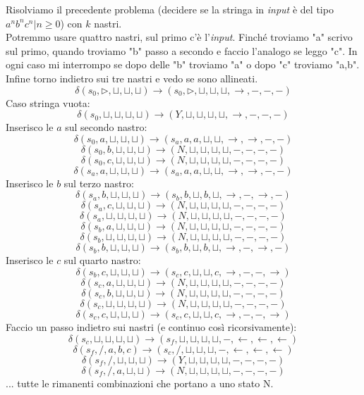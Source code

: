 \begin{esempio}
  Risolviamo il precedente problema (decidere se la stringa in \textit{input} è del tipo
  $a^nb^nc^n | n\geq0$) con $k$ nastri.\\
   Potremmo usare quattro nastri, sul primo c'è l'\textit{input}. Finché  troviamo "a" scrivo sul
  primo, quando  troviamo "b" passo a secondo e faccio l'analogo se leggo "c". In
  ogni caso mi interrompo se dopo delle "b"  troviamo "a" o dopo "c"  troviamo
  "a,b". Infine torno indietro sui tre nastri e vedo se sono allineati.
    \[\delta(s_0,\triangleright, \sqcup, \sqcup, \sqcup)\to (s_0, \triangleright , \sqcup, \sqcup, \sqcup, \rightarrow, -, - ,-)\]
    Caso stringa vuota:
    \[\delta(s_0,\sqcup, \sqcup, \sqcup, \sqcup)\to (Y, \sqcup , \sqcup, \sqcup, \sqcup, \rightarrow, -, -, -)\]
    Inserisco le $a$ sul secondo nastro:
    \[\delta(s_0, a, \sqcup, \sqcup, \sqcup)\to (s_a, a , a, \sqcup, \sqcup, \rightarrow, \rightarrow, -, -)\]
    \[\delta(s_0, b, \sqcup, \sqcup, \sqcup)\to (N, \sqcup, \sqcup, \sqcup, \sqcup, -, -, -, -)\]
    \[\delta(s_0, c, \sqcup, \sqcup, \sqcup)\to (N, \sqcup, \sqcup, \sqcup, \sqcup, -, -, -, -)\]
    \[\delta(s_a, a, \sqcup, \sqcup, \sqcup)\to (s_a, a, a, \sqcup, \sqcup, \rightarrow, \rightarrow, -, -)\]
    Inserisco le $b$ sul terzo nastro:
    \[\delta(s_a, b, \sqcup, \sqcup, \sqcup)\to (s_b, b, \sqcup, b, \sqcup, \rightarrow,  -, \rightarrow, -)\]
    \[\delta(s_a, c, \sqcup, \sqcup, \sqcup)\to (N, \sqcup, \sqcup, \sqcup, \sqcup, -, -, -, -)\]
    \[\delta(s_a, \sqcup, \sqcup, \sqcup, \sqcup)\to (N, \sqcup, \sqcup, \sqcup, \sqcup, -, -, -, -)\]
    \[\delta(s_b, a, \sqcup, \sqcup, \sqcup)\to (N, \sqcup, \sqcup, \sqcup, \sqcup, -, -, -, -)\]
    \[\delta(s_b, \sqcup, \sqcup, \sqcup, \sqcup)\to (N, \sqcup, \sqcup, \sqcup, \sqcup, -, -, -, -)\]
    \[\delta(s_b, b, \sqcup, \sqcup, \sqcup)\to (s_b, b, \sqcup, b, \sqcup, \rightarrow, -, \rightarrow, -)\]
    Inserisco le $c$ sul quarto nastro:
    \[\delta(s_b, c, \sqcup, \sqcup, \sqcup)\to (s_c, c, \sqcup, \sqcup, c, \rightarrow, -, -, \rightarrow)\]
    \[\delta(s_c, a, \sqcup, \sqcup, \sqcup)\to (N, \sqcup, \sqcup, \sqcup, \sqcup, -, -, -, -)\]
    \[\delta(s_c, b, \sqcup, \sqcup, \sqcup)\to (N, \sqcup, \sqcup, \sqcup, \sqcup, -, -, -, -)\]
    \[\delta(s_c, \sqcup, \sqcup, \sqcup, \sqcup)\to (N, \sqcup, \sqcup, \sqcup, \sqcup, -, -, -, -)\]
    \[\delta(s_c, c, \sqcup, \sqcup, \sqcup)\to (s_c, c, \sqcup, \sqcup, c, \rightarrow, -, -, \rightarrow)\]
    Faccio un passo indietro sui nastri (e continuo così ricorsivamente):
    \[\delta(s_c, \sqcup, \sqcup, \sqcup, \sqcup)\to (s_f, \sqcup, \sqcup, \sqcup, \sqcup, -, \leftarrow, \leftarrow, \leftarrow)\]
    \[\delta(s_f, /, a, b, c)\to (s_c, /, \sqcup, \sqcup, \sqcup, -, \leftarrow, \leftarrow, \leftarrow)\]
    \[\delta(s_f, /, \sqcup, \sqcup, \sqcup)\to (Y, \sqcup, \sqcup, \sqcup, \sqcup, -, -, -, -)\]
    \[\delta(s_f, /, a, \sqcup, \sqcup)\to (N, \sqcup, \sqcup, \sqcup, \sqcup, -, -, -, -)\]
    ... tutte le rimanenti combinazioni che portano a uno stato N.
\end{esempio}
